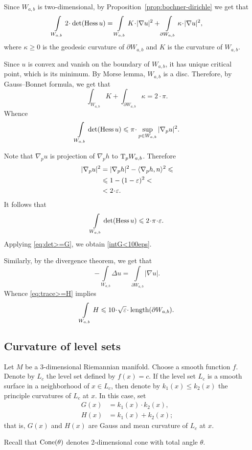 Since $W_{a,b}$ is two-dimensional, by Proposition~\ref{prop:bochner-dirichle} we get that
\[\int\limits_{W_{a,b}} 
2\cdot\det(\Hess u)
=\int\limits_{W_{a,b}} 
K\cdot|\nabla u|^2
+
\int\limits_{\partial W_{a,b}}
\kappa\cdot|\nabla u|^2,\]
where $\kappa\ge 0$ is the geodesic curvature of $\partial W_{a,b}$
and $K$ is the curvature of $W_{a,b}$.

Since $u$ is convex and vanish on the boundary of $W_{a,b}$,
it has unique critical point, which is its minimum.
By Morse lemma,  $W_{a,b}$ is a disc.
Therefore, by Gauss--Bonnet formula, we get that
\[\int_{W_{a,b}} K+\int_{\partial{W_{a,b}}}\kappa=2\cdot\pi.\]
Whence 
\[\int\limits_{W_{a,b}} 
\det(\Hess u)
\le\pi\cdot\sup_{p\in{W_{a,b}}}|\nabla_p u|^2.\]

Note that $\nabla_p u$ is projection of $\nabla_ph$ to $\mathrm{T}_pW_{a,b}$.
Therefore
\begin{align*}
|\nabla_p u|^2&=|\nabla_p h|^2-\langle\nabla_p h,n\rangle^2\le
\\
&\le1-(1-\eps)^2<
\\
&<2\cdot\eps.
\end{align*}
It follows that 
\[\int\limits_{W_{a,b}} 
\det(\Hess u)
\le2\cdot \pi\cdot\eps.\]
Applying \ref{eq:det>=G}, we obtain \ref{intG<100eps}.

Similarly,  by the divergence theorem, we get that
\[-\int\limits_{W_{a,b}} \Delta u=\int\limits_{\partial{W_{a,b}}} |\nabla u|.\]
Whence \ref{eq:trace>=H} implies 
\[\int\limits_{W_{a,b}} H\le 10\cdot \sqrt{\eps}\cdot \length(\partial{W_{a,b}}).\]
\qeds

\subsection{Curvature of level sets}

Let $M$ be a 3-dimensional Riemannian manifold.
Choose a smooth function $f$.
Denote by $L_c$ the level set defined by $f(x)=c$.
If the level set $L_c$ is a smooth surface in a neighborhood of $x\in L_c$,
then denote by $k_1(x)\le k_2(x)$ the principle curvatures of $L_c$ at $x$.
In this case, set 
\begin{align*}
G(x)&=k_1(x)\cdot k_2(x),
\\
H(x)&=k_1(x)+ k_2(x);
\end{align*}
that is, $G(x)$ and $H(x)$ are Gauss and mean curvature of $L_c$ at $x$.

Recall that $\operatorname{Cone}(\theta)$ denotes 2-dimensional cone with total angle $\theta$.

